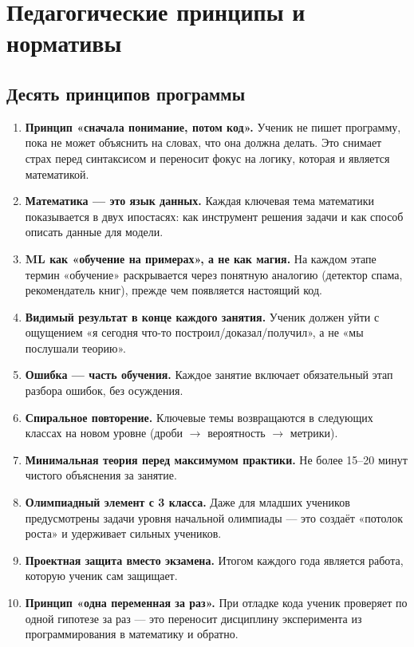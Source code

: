 \documentclass[12pt,a4paper]{article}
\begin{document}
\newpage
\tableofcontents
\newpage

\section{Педагогические принципы и нормативы}

\subsection{Десять принципов программы}

\begin{enumerate}
  \item \textbf{Принцип «сначала понимание, потом код».} Ученик не пишет программу,
  пока не может объяснить на словах, что она должна делать. Это снимает страх перед
  синтаксисом и переносит фокус на логику, которая и является математикой.
  \item \textbf{Математика --- это язык данных.} Каждая ключевая тема математики
  показывается в двух ипостасях: как инструмент решения задачи и как способ описать
  данные для модели.
  \item \textbf{ML как «обучение на примерах», а не как магия.} На каждом этапе
  термин «обучение» раскрывается через понятную аналогию (детектор спама,
  рекомендатель книг), прежде чем появляется настоящий код.
  \item \textbf{Видимый результат в конце каждого занятия.} Ученик должен уйти
  с ощущением «я сегодня что-то построил/доказал/получил», а не «мы послушали теорию».
  \item \textbf{Ошибка --- часть обучения.} Каждое занятие включает
  обязательный этап разбора ошибок, без осуждения.
  \item \textbf{Спиральное повторение.} Ключевые темы возвращаются в следующих
  классах на новом уровне (дроби $\rightarrow$ вероятность $\rightarrow$ метрики).
  \item \textbf{Минимальная теория перед максимумом практики.} Не более
  15--20 минут чистого объяснения за занятие.
  \item \textbf{Олимпиадный элемент с 3 класса.} Даже для младших учеников
  предусмотрены задачи уровня начальной олимпиады --- это создаёт
  «потолок роста» и удерживает сильных учеников.
  \item \textbf{Проектная защита вместо экзамена.} Итогом каждого года
  является работа, которую ученик сам защищает.
  \item \textbf{Принцип «одна переменная за раз».} При отладке кода ученик
  проверяет по одной гипотезе за раз --- это переносит дисциплину эксперимента
  из программирования в математику и обратно.
\end{enumerate}
\end{document}
